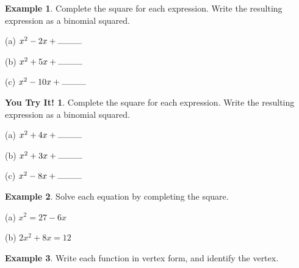 \documentclass{report}
\theoremstyle{definition}
\newtheorem{example}{\bf Example}
\newtheorem{youtry}{\textbf{You Try It!}}
\begin{document}
\begin{example}
Complete the square for each expression. Write the resulting expression as a binomial squared.
\end{example}


\begin{minipage}[t]{0.3\linewidth}
(a)  $x^2-2x+\rule{1cm}{0.01cm}$
\end{minipage}
\hfill
\begin{minipage}[t]{0.3\linewidth}
(b)  $x^2+5x+\rule{1cm}{0.01cm}$
\end{minipage}
\hfill
\begin{minipage}[t]{0.3\linewidth}
(c)  $x^2-10x+\rule{1cm}{0.01cm}$
\end{minipage}

\vfill

\begin{youtry}
Complete the square for each expression. Write the resulting expression as a binomial squared.
\end{youtry}

\begin{minipage}[t]{0.3\linewidth}
(a)  $x^2+4x+\rule{1cm}{0.01cm}$
\end{minipage}
\hfill
\begin{minipage}[t]{0.3\linewidth}
(b)  $x^2+3x+\rule{1cm}{0.01cm}$
\end{minipage}
\hfill
\begin{minipage}[t]{0.3\linewidth}
(c)  $x^2-8x+\rule{1cm}{0.01cm}$
\end{minipage}

\vspace{0.5cm}


 \newpage


\begin{example}
Solve each equation by completing the square.
\end{example}


\begin{minipage}[t]{0.45\linewidth}
(a)  $x^2=27-6x$
\end{minipage}
\hfill
\begin{minipage}[t]{0.45\linewidth}
(b)  $2x^2+8x=12$
\end{minipage}


\vfill

\begin{example}
Write each function in vertex form, and identify the vertex.
\end{example}
\end{document}
